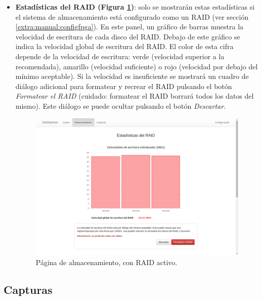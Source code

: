 \begin{itemize}
\item \textbf{Estadísticas del \gls{RAID} (Figura \ref{fig:captura:raid})}: solo se mostrarán estas estadísticas si el sistema de almacenamiento está configurado como un \gls{RAID} (ver sección \ref{extra:manual:configfpga}). En este panel, un gráfico de barras muestra la velocidad de escritura de cada disco del \gls{RAID}. Debajo de este gráfico se indica la velocidad global de escritura del \gls{RAID}. El color de esta cifra depende de la velocidad de escritura: verde (velocidad superior a la recomendada), amarillo (velocidad suficiente) o rojo (velocidad por debajo del mínimo aceptable). Si la velocidad es insuficiente se mostrará un cuadro de diálogo adicional para formatear y recrear el \gls{RAID} pulsando el botón \textit{Formatear el \gls{RAID}} (cuidado: formatear el \gls{RAID} borrará todos los datos del mismo). Este diálogo se puede ocultar pulsando el botón \textit{Descartar}.
\begin{figure}[!htp]
  \centering
  \includegraphics[width=\textwidth,clip=true]{graphics/capturas/almacenamiento_raid}
  \caption{Página de almacenamiento, con \gls{RAID} activo.}
  \label{fig:captura:raid}
\end{figure}
\end{itemize}


\subsection{Capturas\label{extra:manual:capturas}}

